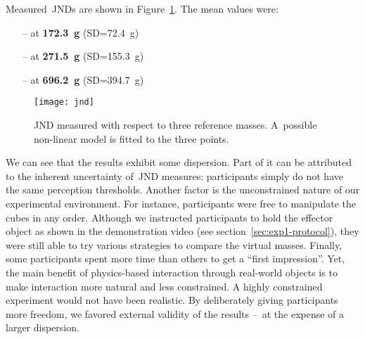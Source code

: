 \documentclass{vgtc}
\begin{document}
Measured~JNDs are shown in Figure~\ref{fig:jnd}. The mean values were:
\begin{itemize}
\item[--] at   \textbf{\SI{172.3}{\gram}} (SD=\SI{72.4}{\gram})
\item[--] at  \textbf{\SI{271.5}{\gram}} (SD=\SI{155.3}{\gram})
\item[--] at  \textbf{\SI{696.2}{\gram}} (SD=\SI{394.7}{\gram})
\end{itemize}
\begin{figure}[h]
  \vspace{-3.5mm}
  \centering
  \texttt{[image: jnd]}
  \vspace{-2mm}
  \caption{JND measured with respect to three reference masses. A~possible non-linear model is fitted to the three points.}
  \label{fig:jnd}
  \vspace{-.75mm}
\end{figure}

We can see that the results exhibit some dispersion. Part of it can be attributed to the inherent uncertainty of~JND measures: participants simply do not have the same perception thresholds. Another factor is the unconstrained nature of our experimental environment. For instance, participants were free to manipulate the cubes in any order. Although we instructed participants to hold the effector \mbox{object} as shown in the demonstration video (see section~\ref{sec:exp1-protocol}), they were still able to try various strategies to compare the virtual masses. \mbox{Finally,} some participants spent more time than others to get a ``first impression''. Yet, the main benefit of physics-based interaction through real-world objects is to make interaction more natural and less constrained. A highly constrained experiment would not have been realistic. By deliberately giving participants more freedom, we favored external validity of the results --~at the expense of a larger dispersion.
\end{document}
